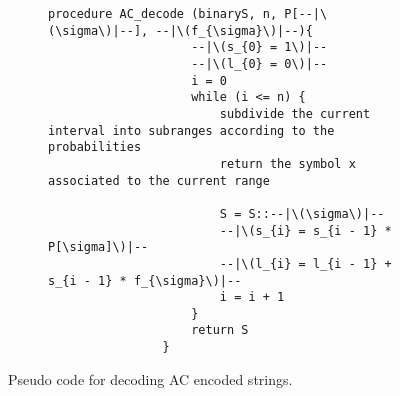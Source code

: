 \documentclass{subfiles}
\begin{document}
    \begin{figure}[!h]
        \centering
        \begin{subfigure}{0.75\textwidth}
            \begin{lstlisting}[language=ALGOL]
                procedure AC_decode (binaryS, n, P[--|\(\sigma\)|--], --|\(f_{\sigma}\)|--){
                    --|\(s_{0} = 1\)|--
                    --|\(l_{0} = 0\)|--
                    i = 0
                    while (i <= n) {
                        subdivide the current interval into subranges according to the probabilities
                        return the symbol x associated to the current range 
                        
                        S = S::--|\(\sigma\)|-- 
                        --|\(s_{i} = s_{i - 1} * P[\sigma]\)|--
                        --|\(l_{i} = l_{i - 1} + s_{i - 1} * f_{\sigma}\)|--
                        i = i + 1
                    }
                    return S
                }
            \end{lstlisting}
        \end{subfigure}
        \caption{Pseudo code for decoding AC encoded strings.}
        \label{Fig:5}
    \end{figure}
\end{document}
